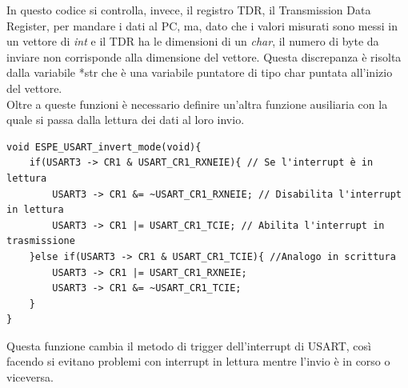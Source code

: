 In questo codice si controlla, invece, il registro TDR, il Transmission Data Register, per mandare i dati al PC, ma, dato che i valori misurati sono messi in un vettore di \textit{int} e il TDR ha le dimensioni di un \textit{char}, il numero di byte da inviare non corrisponde alla dimensione del vettore. Questa discrepanza è risolta dalla variabile *str che è una variabile puntatore di tipo char puntata all'inizio del vettore.\\


Oltre a queste funzioni è necessario definire un'altra funzione ausiliaria con la quale si passa dalla lettura dei dati al loro invio.\\

\noindent
\begin{verbatim}
void ESPE_USART_invert_mode(void){
    if(USART3 -> CR1 & USART_CR1_RXNEIE){ // Se l'interrupt è in lettura
        USART3 -> CR1 &= ~USART_CR1_RXNEIE; // Disabilita l'interrupt in lettura
        USART3 -> CR1 |= USART_CR1_TCIE; // Abilita l'interrupt in trasmissione
    }else if(USART3 -> CR1 & USART_CR1_TCIE){ //Analogo in scrittura
        USART3 -> CR1 |= USART_CR1_RXNEIE;
        USART3 -> CR1 &= ~USART_CR1_TCIE;
    }
}
\end{verbatim}

Questa funzione cambia il metodo di trigger dell'interrupt di USART, così facendo si evitano problemi con interrupt in lettura mentre l'invio è in corso o viceversa.\\



